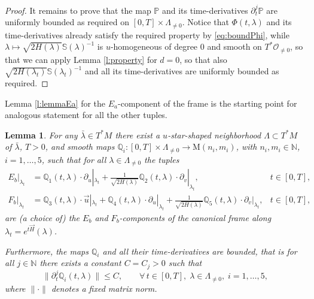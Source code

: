 \documentclass[11pt,a4paper]{article}
\theoremstyle{plain}
\newtheorem{lemma}[theorem]{Lemma}
\theoremstyle{definition}
\theoremstyle{remark}
\numberwithin{equation}{section}
\newcommand{\N}{\mathbb{N}} %
\renewcommand{\P}{\mathbb{P}}
\newcommand{\Q}{\mathbb{Q}}
\renewcommand{\S}{\mathbb{S}}
\begin{document}
\begin{proof}
It remains to prove that the map $\P$ and its time-derivatives $\partial_t^j\P$ are uniformly bounded as required on $[0,T]\times \Lambda_{\neq 0}$. Notice that $\Phi(t,\lambda)$ and its time-derivatives already satisfy the required property by \eqref{eq:boundPhi}, while $\lambda \mapsto \sqrt{2H(\lambda)}\S(\lambda)^{-1}$ is $u$-homogeneous of degree $0$ and smooth on $T^*\mathcal{O}_{\neq 0}$, so that we can apply Lemma \ref{l:property} for $d=0$, so that also $\sqrt{2H(\lambda_t)}\S(\lambda_t)^{-1}$ and all its time-derivatives are uniformly bounded as required.
\end{proof}

Lemma \ref{l:lemmaEa} for the $E_a$-component of the frame is the starting point for analogous statement for all the other tuples.


\begin{lemma}\label{l:lemmaEbFb}
For any $\bar{\lambda}\in T^*M$ there exist a $u$-star-shaped neighborhood $\Lambda \subset T^*M$ of $\bar{\lambda}$, $T>0$, and smooth maps $\Q_i: [0,T]\times  \Lambda_{\neq 0} \to \mathrm{M}(n_i,m_i)$, with $n_i,m_i \in \N$, $i=1,\dots,5$, such that for all $\lambda \in \Lambda_{\neq 0}$ the tuples
\begin{align}
E_b|_{\lambda_t} & = \Q_1(t,\lambda)\cdot \partial_u|_{\lambda_t}  + \frac{1}{\sqrt{2H(\lambda)}}\Q_2(t,\lambda) \cdot \partial_v|_{\lambda_t} , & t\in [0,T],\\
F_b|_{\lambda_t} & = \Q_3(t,\lambda)\cdot \vec{u} |_{\lambda_t} + \Q_4(t,\lambda)\cdot\partial_u|_{\lambda_t}  + \frac{1}{\sqrt{2H(\lambda)}}\Q_5(t,\lambda)\cdot\partial_v|_{\lambda_t} ,  & t\in [0,T],
\end{align}
are (a choice of) the $E_b$ and $F_b$-components of the canonical frame along $\lambda_t = e^{t\vec{H}}(\lambda)$.

Furthermore, the maps $\Q_i$ and all their time-derivatives are bounded, that is for all $j\in \N$ there exists a constant $C = C_j>0$ such that
\begin{equation}
\|\partial_t^{j}\Q_i(t,\lambda)\| \leq C ,\qquad \forall\, t \in [0,T],\; \lambda \in \Lambda_{\neq 0},\; i=1,\dots,5,
\end{equation}
where $\|\cdot\|$ denotes a fixed matrix norm.
\end{lemma}
\end{document}
